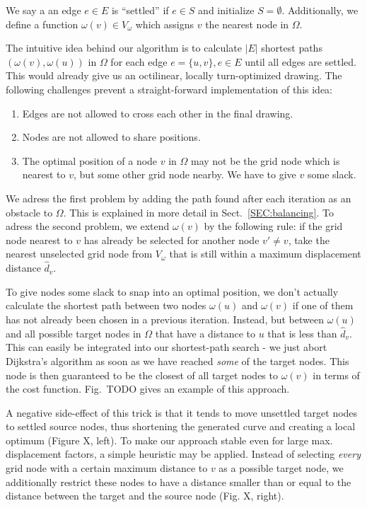 \documentclass{sig-alternate-sigmod09}
\begin{document}
We say a an edge $e \in E$ is ``settled'' if $e \in S$ and initialize $S = \emptyset$. Additionally, we define a function $\omega(v) \in V_\omega$ which assigns $v$ the nearest node in $\Omega$.

  The intuitive idea behind our algorithm is to calculate
$|E|$ shortest paths $\left(\omega\left(v\right), \omega\left(u\right)\right)$ in $\Omega$ for each edge $e = \{u, v\}, e \in E$ until all edges are settled. This would already give us an octilinear, locally turn-optimized drawing. The following challenges prevent a straight-forward implementation of this idea:
\begin{enumerate}
\item Edges are not allowed to cross each other in the final drawing.
\item Nodes are not allowed to share positions.
\item The optimal position of a node $v$ in $\Omega$ may not be the grid node which is nearest to $v$, but some other grid node nearby. We have to give $v$ some slack.
\end{enumerate}

We adress the first problem by adding the path found after each iteration as an obstacle to $\Omega$. This is explained in more detail in Sect.~\ref{SEC:balancing}. To adress the second problem, we extend $\omega(v)$ by the following rule: if the grid node nearest to $v$ has already be selected for another node $v' \neq v$, take the nearest unselected grid node from $V_\omega$ that is still within a maximum displacement distance $\hat d_v$.


To give nodes some slack to snap into an optimal position, we don't actually calculate the shortest path between two nodes $\omega(u)$ and $\omega(v)$ if one of them has not already been chosen in a previous iteration. Instead, but between $\omega(u)$ and all possible target nodes in $\Omega$ that have a distance to $u$ that is less than $\hat d_v$. This can easily be integrated into our shortest-path search - we just abort Dijkstra's algorithm as soon as we have reached \emph{some} of the target nodes. This node is then guaranteed to be the closest of all target nodes to $\omega(v)$ in terms of the cost function. Fig.~TODO gives an example of this approach.

A negative side-effect of this trick is that it tends to move unsettled target nodes to settled source nodes, thus shortening the generated curve and creating a local optimum (Figure X, left). To make our approach stable even for large max. displacement factors, a simple heuristic may be applied. Instead of selecting \emph{every} grid node with a certain maximum distance to $v$ as a possible target node, we additionally restrict these nodes to have a distance smaller than or equal to the distance between the target and the source node (Fig. X, right).
\end{document}

